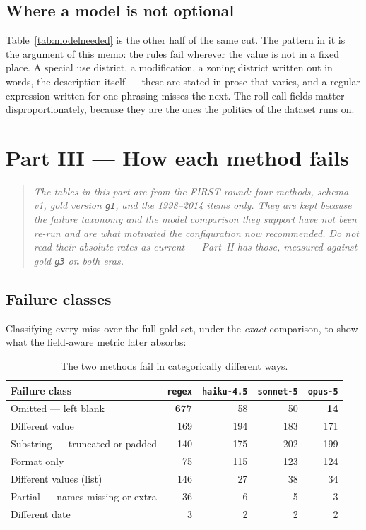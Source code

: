 \documentclass[11pt]{article}
\begin{document}
\subsection{Where a model is not optional}

Table~\ref{tab:modelneeded} is the other half of the same cut. The pattern in it is the
argument of this memo: the rules fail wherever the value is not in a fixed place. A special
use district, a modification, a zoning district written out in words, the description
itself --- these are stated in prose that varies, and a regular expression written for one
phrasing misses the next. The roll-call fields matter disproportionately, because they are
the ones the politics of the dataset runs on.


\section{Part III --- How each method fails}

\begin{quote}\small\itshape
The tables in this part are from the FIRST round: four methods, schema v1, gold version
\texttt{g1}, and the 1998--2014 items only. They are kept because the failure taxonomy and the
model comparison they support have not been re-run and are what motivated the configuration
now recommended. Do not read their absolute rates as current --- Part~II has those, measured
against gold \texttt{g3} on both eras.
\end{quote}

\subsection{Failure classes}

Classifying every miss over the full gold set, under the \emph{exact} comparison, to show
what the field-aware metric later absorbs:

\begin{table}[h]
\centering
\begin{tabular}{lrrrr}
\toprule
Failure class & \texttt{regex} & \texttt{haiku-4.5} & \texttt{sonnet-5} & \texttt{opus-5} \\
\midrule
Omitted --- left blank             & \textbf{677} & 58 & 50 & \textbf{14} \\
Different value                    & 169 & 194 & 183 & 171 \\
Substring --- truncated or padded  & 140 & 175 & 202 & 199 \\
Format only                        &  75 & 115 & 123 & 124 \\
Different values (list)            & 146 &  27 &  38 &  34 \\
Partial --- names missing or extra &  36 &   6 &   5 &   3 \\
Different date                     &   3 &   2 &   2 &   2 \\
\bottomrule
\end{tabular}
\caption{The two methods fail in categorically different ways.}
\end{table}
\end{document}
